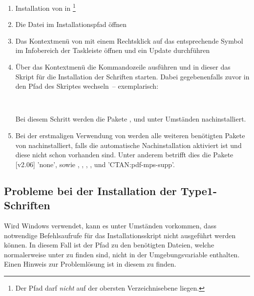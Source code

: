\begin{enumerate}
\item Installation von  in 
  \footnote{Der Pfad darf \emph{nicht} auf der obersten Verzeichnisebene 
   liegen.
  }
\item Die Datei  im Installationspfad öffnen
\item Das Kontextmenü von  mit einem 
  Rechtsklick auf das entsprechende Symbol im Infobereich der Taskleiste öffnen 
  und ein Update durchführen
\item Über das Kontextmenü die Kommandozeile ausführen und in dieser das Skript 
  für die Installation der Schriften  starten.
  Dabei gegebenenfalls zuvor in den Pfad des Skriptes wechseln~-- exemplarisch:
  \begin{quoting}[leftmargin=1.5em,rightmargin=0pt]
  \newline
  \,
  \end{quoting}
  Bei diesem Schritt werden die Pakete ,  
  und  unter Umständen nachinstalliert.
\item Bei der erstmaligen Verwendung von \TUDScript werden alle weiteren 
  benötigten Pakete von  
  nachinstalliert, falls die automatische Nachinstallation aktiviert ist und 
  diese nicht schon vorhanden sind. Unter anderem betrifft dies die Pakete 
  [v2.06]
  'none',  sowie , 
   , , 
  ,  und 
  'CTAN:pdf-mps-supp'.
\end{enumerate}



\subsection{Probleme bei der Installation der Type1-Schriften}
%
Wird Windows verwendet, kann es unter Umständen vorkommen, dass notwendige 
Befehlsaufrufe für das Installationsskript nicht ausgeführt werden können. In 
diesem Fall ist der Pfad zu den benötigten Dateien, welche normalerweise unter 
 zu finden sind, nicht in der 
Umgebungsvariable  enthalten. Einen Hinweis zur Problemlösung ist 
in diesem  zu finden.

